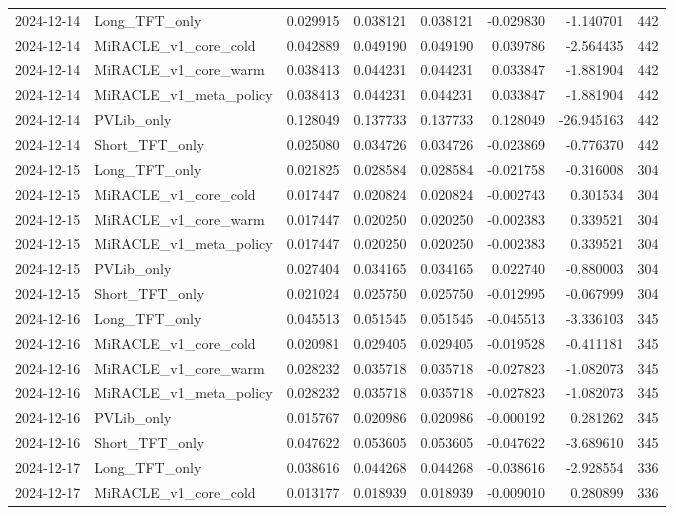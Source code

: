 \begin{tabular}{llrrrrrr}
2024-12-14 & Long_TFT_only & 0.029915 & 0.038121 & 0.038121 & -0.029830 & -1.140701 & 442 \\
2024-12-14 & MiRACLE_v1_core_cold & 0.042889 & 0.049190 & 0.049190 & 0.039786 & -2.564435 & 442 \\
2024-12-14 & MiRACLE_v1_core_warm & 0.038413 & 0.044231 & 0.044231 & 0.033847 & -1.881904 & 442 \\
2024-12-14 & MiRACLE_v1_meta_policy & 0.038413 & 0.044231 & 0.044231 & 0.033847 & -1.881904 & 442 \\
2024-12-14 & PVLib_only & 0.128049 & 0.137733 & 0.137733 & 0.128049 & -26.945163 & 442 \\
2024-12-14 & Short_TFT_only & 0.025080 & 0.034726 & 0.034726 & -0.023869 & -0.776370 & 442 \\
2024-12-15 & Long_TFT_only & 0.021825 & 0.028584 & 0.028584 & -0.021758 & -0.316008 & 304 \\
2024-12-15 & MiRACLE_v1_core_cold & 0.017447 & 0.020824 & 0.020824 & -0.002743 & 0.301534 & 304 \\
2024-12-15 & MiRACLE_v1_core_warm & 0.017447 & 0.020250 & 0.020250 & -0.002383 & 0.339521 & 304 \\
2024-12-15 & MiRACLE_v1_meta_policy & 0.017447 & 0.020250 & 0.020250 & -0.002383 & 0.339521 & 304 \\
2024-12-15 & PVLib_only & 0.027404 & 0.034165 & 0.034165 & 0.022740 & -0.880003 & 304 \\
2024-12-15 & Short_TFT_only & 0.021024 & 0.025750 & 0.025750 & -0.012995 & -0.067999 & 304 \\
2024-12-16 & Long_TFT_only & 0.045513 & 0.051545 & 0.051545 & -0.045513 & -3.336103 & 345 \\
2024-12-16 & MiRACLE_v1_core_cold & 0.020981 & 0.029405 & 0.029405 & -0.019528 & -0.411181 & 345 \\
2024-12-16 & MiRACLE_v1_core_warm & 0.028232 & 0.035718 & 0.035718 & -0.027823 & -1.082073 & 345 \\
2024-12-16 & MiRACLE_v1_meta_policy & 0.028232 & 0.035718 & 0.035718 & -0.027823 & -1.082073 & 345 \\
2024-12-16 & PVLib_only & 0.015767 & 0.020986 & 0.020986 & -0.000192 & 0.281262 & 345 \\
2024-12-16 & Short_TFT_only & 0.047622 & 0.053605 & 0.053605 & -0.047622 & -3.689610 & 345 \\
2024-12-17 & Long_TFT_only & 0.038616 & 0.044268 & 0.044268 & -0.038616 & -2.928554 & 336 \\
2024-12-17 & MiRACLE_v1_core_cold & 0.013177 & 0.018939 & 0.018939 & -0.009010 & 0.280899 & 336 \\

\end{tabular}
